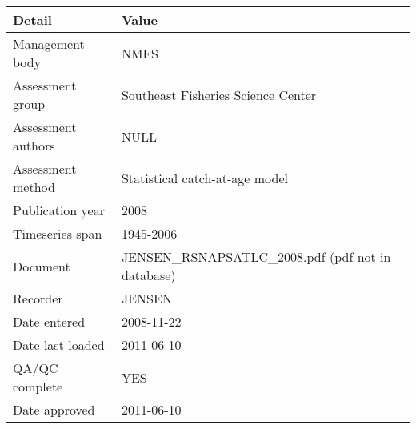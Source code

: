 \begin{table}[htb]
\centering
\begin{tabular}{lp{7cm}}
\toprule
Detail & Value \\
\midrule
Management body    & NMFS                                               \\
Assessment group   & Southeast Fisheries Science Center                 \\
Assessment authors & NULL                                               \\
Assessment method  & Statistical catch-at-age model                     \\
Publication year   & 2008                                               \\
Timeseries span    & 1945-2006                                          \\
Document           & JENSEN\_RSNAPSATLC\_2008.pdf (pdf not in database) \\
Recorder           & JENSEN                                             \\
Date entered       & 2008-11-22                                         \\
Date last loaded   & 2011-06-10                                         \\
QA/QC complete     & YES                                                \\
Date approved      & 2011-06-10                                         \\
\bottomrule
\end{tabular}
\label{tab:assessdet}
\end{table}
